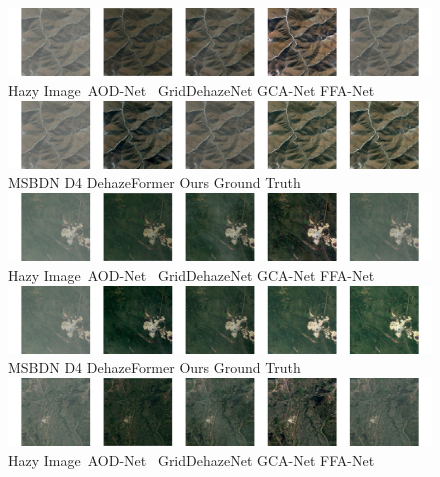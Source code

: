 \documentclass[lettersize,journal]{IEEEtran}
\begin{document}
\begin{figure}[pht]
    \centering
    \includegraphics[width=14.5cm]{rice_0_1.jpg} \\
    Hazy Image\qquad\;\ AOD-Net\cite{li2017aod} \;\ GridDehazeNet\cite{liu2019griddehazenet} \;\; GCA-Net\cite{chen2019gated} \quad\; FFA-Net\cite{qin2020ffa}\\
    
    \includegraphics[width=14.5cm]{rice_0_2.jpg} \\ 
    MSBDN \cite{msbdn2020}\qquad\quad D4\cite{yang2022d4} \quad\;\;\; DehazeFormer\cite{dehazeformer} \qquad\; Ours \qquad\quad\;\; Ground Truth \\
    
    \includegraphics[width=14.5cm]{rice_1_1.jpg} \\ 
    Hazy Image\qquad\;\ AOD-Net\cite{li2017aod} \;\ GridDehazeNet\cite{liu2019griddehazenet} \;\; GCA-Net\cite{chen2019gated} \quad\; FFA-Net\cite{qin2020ffa}\\
    
    \includegraphics[width=14.5cm]{rice_1_2.jpg} \\ 
    MSBDN \cite{msbdn2020}\qquad\quad D4\cite{yang2022d4} \quad\;\;\; DehazeFormer\cite{dehazeformer} \qquad\; Ours \qquad\quad\;\; Ground Truth \\
    
    \includegraphics[width=14.5cm]{rice_2_1.jpg} \\
    Hazy Image\qquad\;\ AOD-Net\cite{li2017aod} \;\ GridDehazeNet\cite{liu2019griddehazenet} \;\; GCA-Net\cite{chen2019gated} \quad\; FFA-Net\cite{qin2020ffa}\\   
    

\end{figure}
\end{document}
